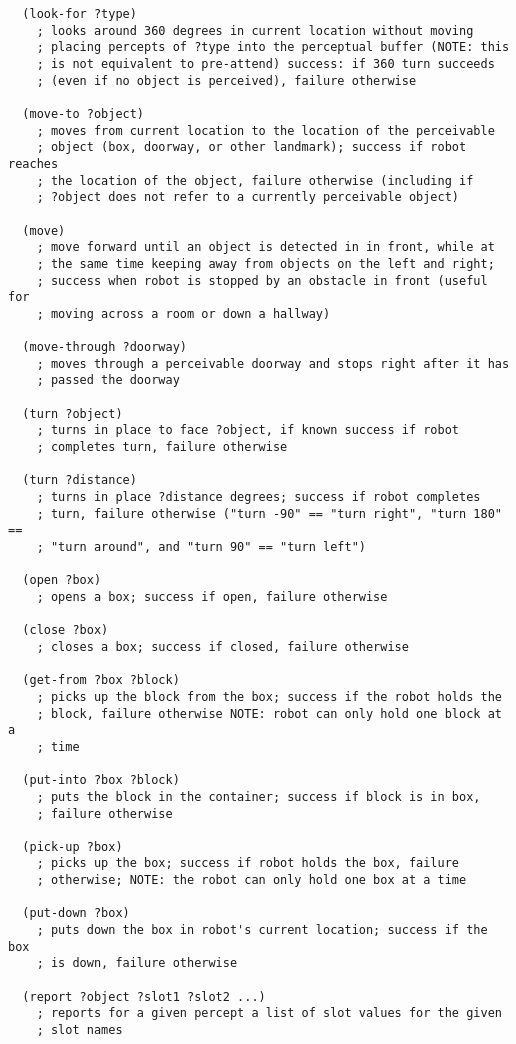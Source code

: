 \documentclass{article}
\begin{document}
\begin{verbatim}
  (look-for ?type)
    ; looks around 360 degrees in current location without moving
    ; placing percepts of ?type into the perceptual buffer (NOTE: this
    ; is not equivalent to pre-attend) success: if 360 turn succeeds
    ; (even if no object is perceived), failure otherwise

  (move-to ?object)
    ; moves from current location to the location of the perceivable
    ; object (box, doorway, or other landmark); success if robot reaches
    ; the location of the object, failure otherwise (including if
    ; ?object does not refer to a currently perceivable object)

  (move)
    ; move forward until an object is detected in in front, while at
    ; the same time keeping away from objects on the left and right;
    ; success when robot is stopped by an obstacle in front (useful for
    ; moving across a room or down a hallway)

  (move-through ?doorway)
    ; moves through a perceivable doorway and stops right after it has
    ; passed the doorway

  (turn ?object)
    ; turns in place to face ?object, if known success if robot
    ; completes turn, failure otherwise

  (turn ?distance)
    ; turns in place ?distance degrees; success if robot completes
    ; turn, failure otherwise ("turn -90" == "turn right", "turn 180" ==
    ; "turn around", and "turn 90" == "turn left")

  (open ?box)
    ; opens a box; success if open, failure otherwise

  (close ?box)
    ; closes a box; success if closed, failure otherwise
             
  (get-from ?box ?block)
    ; picks up the block from the box; success if the robot holds the
    ; block, failure otherwise NOTE: robot can only hold one block at a
    ; time

  (put-into ?box ?block)
    ; puts the block in the container; success if block is in box,
    ; failure otherwise
 
  (pick-up ?box)
    ; picks up the box; success if robot holds the box, failure
    ; otherwise; NOTE: the robot can only hold one box at a time

  (put-down ?box)
    ; puts down the box in robot's current location; success if the box
    ; is down, failure otherwise

  (report ?object ?slot1 ?slot2 ...)
    ; reports for a given percept a list of slot values for the given
    ; slot names

\end{verbatim}
\end{document}
